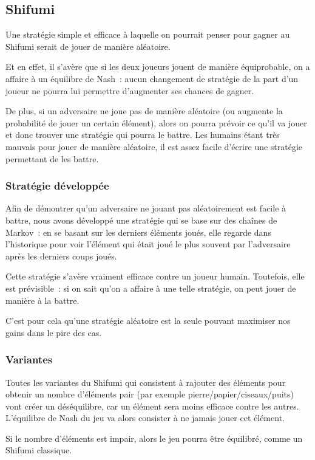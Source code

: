 \subsection{Shifumi}
    Une stratégie simple et efficace à laquelle on pourrait penser pour gagner
    au Shifumi serait de jouer de manière aléatoire.

    Et en effet, il s'avère que si les deux joueurs jouent de manière équiprobable,
    on a affaire à un équilibre de Nash~: aucun changement de stratégie de la part
    d'un joueur ne pourra lui permettre d'augmenter ses chances de gagner.

    De plus, si un adversaire ne joue pas de manière aléatoire (ou augmente la
    probabilité de jouer un certain élément), alors on pourra prévoir ce qu'il
    va jouer et donc trouver une stratégie qui pourra le battre. Les humains
    étant très mauvais pour jouer de manière aléatoire, il est assez facile
    d'écrire une stratégie permettant de les battre.

  \subsubsection{Stratégie développée}
    Afin de démontrer qu'un adversaire ne jouant pas aléatoirement est facile
    à battre, nous avons développé une stratégie qui se base sur des chaînes
    de Markov~: en se basant sur les derniers éléments joués, elle regarde
    dans l'historique pour voir l'élément qui était joué le plus souvent par
    l'adversaire après les derniers coups joués.

    Cette stratégie s'avère vraiment efficace contre un joueur humain.
    Toutefois, elle est prévisible~: si on sait qu'on a affaire à une telle
    stratégie, on peut jouer de manière à la battre.

    C'est pour cela qu'une stratégie aléatoire est la seule pouvant maximiser
    nos gains dans le pire des cas.

  \subsubsection{Variantes}
    Toutes les variantes du Shifumi qui consistent à rajouter des éléments
    pour obtenir un nombre d'éléments pair (par exemple
    pierre/papier/ciseaux/puits) vont créer un déséquilibre, car un élément
    sera moins efficace contre les autres. L'équilibre de Nash du jeu va
    alors consister à ne jamais jouer cet élément.

    Si le nombre d'éléments est impair, alors le jeu pourra être équilibré,
    comme un Shifumi classique.

